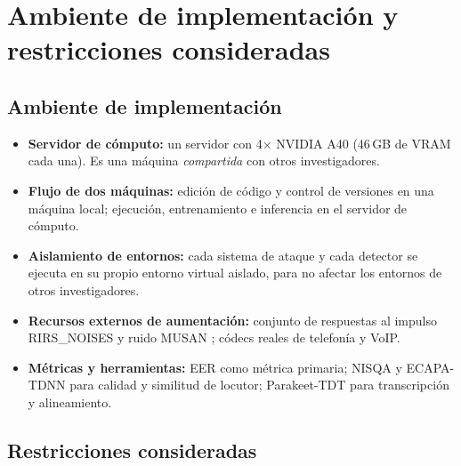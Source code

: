 \documentclass[11pt]{article}
\begin{document}
\section{Ambiente de implementaci\'on y restricciones consideradas}

\subsection{Ambiente de implementaci\'on}

\begin{itemize}[nosep]
  \item \textbf{Servidor de c\'omputo:} un servidor con 4$\times$
  NVIDIA A40 (46\,GB de VRAM cada una). Es una m\'aquina
  \emph{compartida} con otros investigadores.
  \item \textbf{Flujo de dos m\'aquinas:} edici\'on de c\'odigo y control
  de versiones en una m\'aquina local; ejecuci\'on, entrenamiento
  e inferencia en el servidor de c\'omputo.
  \item \textbf{Aislamiento de entornos:} cada sistema de ataque y cada
  detector se ejecuta en su propio entorno virtual aislado, para no
  afectar los entornos de otros investigadores.
  \item \textbf{Recursos externos de aumentaci\'on:} conjunto de respuestas
  al impulso RIRS\_NOISES \citep{ko2017rir} y ruido MUSAN \citep{musan};
  c\'odecs reales de telefon\'ia y VoIP.
  \item \textbf{M\'etricas y herramientas:} EER como m\'etrica primaria;
  NISQA \citep{nisqa} y ECAPA-TDNN \citep{ecapa} para calidad y similitud
  de locutor; Parakeet-TDT \citep{tdt,parakeet} para transcripci\'on y
  alineamiento.
\end{itemize}

\subsection{Restricciones consideradas}
\end{document}
